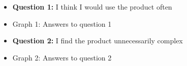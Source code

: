\documentclass{article}
\begin{document}
\begin{itemize}
		\item[] \textbf{Question 1:} I think I would use the product often
		\item[] \begin{minipage}[t]{\linewidth}
         	 \raggedright
          	\medskip
          	\centerline{Graph 1: Answers to question 1}
          \end{minipage}
\end{itemize}
\begin{itemize}
		\item[] \textbf{Question 2:} I find the product unnecessarily complex
		\item[] \begin{minipage}[t]{\linewidth}
         	 \raggedright
          	\medskip
          	\centerline{Graph 2: Answers to question 2}
          \end{minipage}
\end{itemize}
\end{document}
